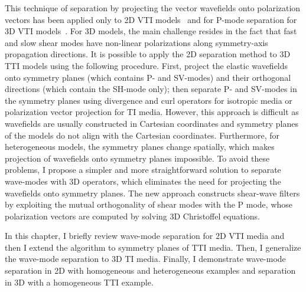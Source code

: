 This technique of separation by projecting the vector wavefields onto
polarization vectors has been applied only to 2D VTI
models~\cite[]{dellinger.thesis,yan:WB19} and for P-mode separation
for 3D VTI models~\cite[]{dellinger.thesis}. For 3D models, the main
challenge resides in the fact that fast and slow shear modes have
non-linear polarizations along symmetry-axis propagation
directions. It is possible to apply the 2D separation method to 3D TTI
models using the following procedure. First, project the elastic
wavefields onto symmetry planes (which contains P- and SV-modes) and
their orthogonal directions (which contain the SH-mode only); then
separate P- and SV-modes in the symmetry planes using divergence and
curl operators for isotropic media or polarization vector projection
for TI media. However, this approach is difficult as wavefields are
usually constructed in Cartesian coordinates and symmetry planes of
the models do not align with the Cartesian coordinates. Furthermore,
for heterogeneous models, the symmetry planes change spatially, which
makes projection of wavefields onto symmetry planes impossible. To
avoid these problems, I propose a simpler and more straightforward
solution to separate wave-modes with 3D operators, which eliminates
the need for projecting the wavefields onto symmetry planes. The new
approach constructs shear-wave filters by exploiting the mutual
orthogonality of shear modes with the P mode, whose polarization
vectors are computed by solving 3D Christoffel equations.

In this chapter, I briefly review wave-mode separation for 2D VTI media
and then I extend the algorithm to symmetry planes of TTI media.
Then, I generalize the wave-mode separation to 3D TI media. Finally,
I demonstrate wave-mode separation in 2D with homogeneous and
heterogeneous examples and separation in 3D with a homogeneous TTI
example.

